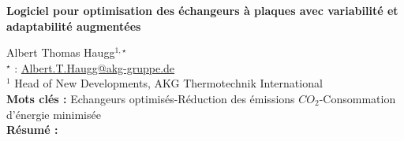 


    \newpage

\BgThispage

%
\begin{flushleft}
\addtocounter{section}{1}
{\Large \textbf{Logiciel pour optimisation des échangeurs à plaques avec variabilité et adaptabilité augmentées}}\label{ref:85}
\end{flushleft}
%
Albert Thomas Haugg$^{1,\star}$\\[2mm]
$^{\star}$ \Letter : \url{Albert.T.Haugg@akg-gruppe.de}\\[2mm]
{\footnotesize $^{1}$ Head of New Developments, AKG Thermotechnik International}\\
[4mm]
%
\noindent \textbf{Mots clés : } Echangeurs optimisés-Réduction des émissions $\unit{CO_2}$-Consommation d'énergie minimisée\\[4mm]
%
\noindent \textbf{Résumé : } 

